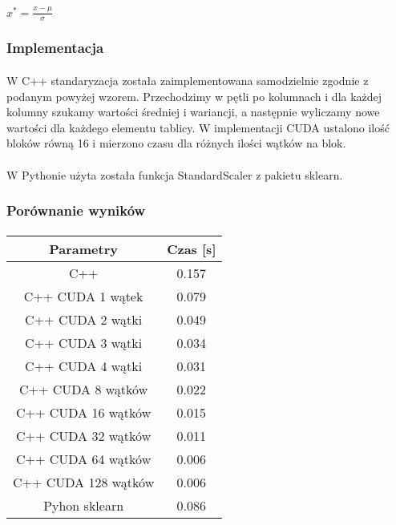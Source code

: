 \documentclass[a4paper,11pt]{article}
\begin{document}
\paragraph{}$x^*=\frac{x-\mu}{\sigma}$
\subsubsection{Implementacja} 
\paragraph{}W C++ standaryzacja została zaimplementowana samodzielnie zgodnie z podanym powyżej wzorem. Przechodzimy w pętli po kolumnach i dla każdej kolumny szukamy wartości średniej i wariancji, a następnie wyliczamy nowe wartości dla każdego elementu tablicy. W implementacji CUDA ustalono ilość bloków równą 16 i mierzono czasu dla różnych ilości wątków na blok.

\paragraph{}W Pythonie użyta została funkcja StandardScaler z pakietu sklearn.

\subsubsection{Porównanie wyników} 

\paragraph{}
\begin{tabular}{|c|c|}
\hline Parametry&Czas [s] \\
\hline C++ & 0.157 \\
\hline C++ CUDA 1 wątek& 0.079 \\
\hline C++ CUDA 2 wątki& 0.049 \\
\hline C++ CUDA 3 wątki& 0.034 \\
\hline C++ CUDA 4 wątki& 0.031 \\
\hline C++ CUDA 8 wątków& 0.022 \\
\hline C++ CUDA 16 wątków& 0.015 \\
\hline C++ CUDA 32 wątków& 0.011 \\
\hline C++ CUDA 64 wątków& 0.006 \\
\hline C++ CUDA 128 wątków& 0.006 \\
\hline
\hline Pyhon sklearn& 0.086 \\
\hline
\end{tabular}
\end{document}
